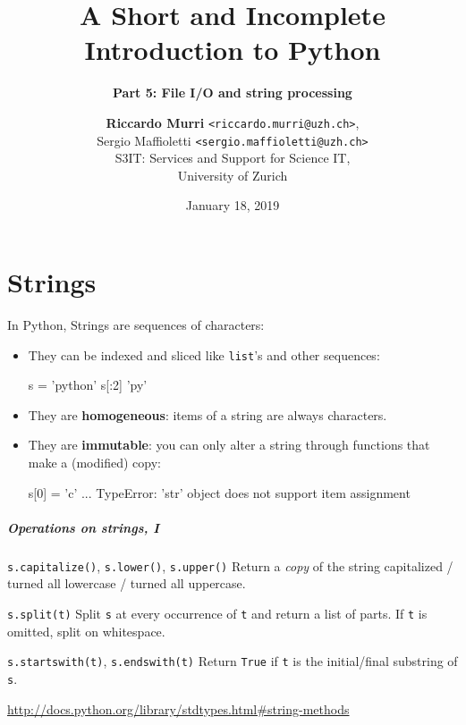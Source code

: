 \documentclass[english,serif,mathserif,xcolor=pdftex,dvipsnames,table]{beamer}
\title[4. Files and strings]{%
  A Short and Incomplete Introduction to Python
}
\subtitle{\bfseries Part 5: File I/O and string processing}
\author[R.~Murri]{%
  \textbf{Riccardo Murri} \texttt{<riccardo.murri@uzh.ch>}, \\
  Sergio Maffioletti \texttt{<sergio.maffioletti@uzh.ch>}
  \\
  S3IT: Services and Support for Science IT,
  \\
  University of Zurich
}
\date{January 18, 2019}
\begin{document}
\maketitle


\part{Strings}


\begin{frame}[fragile]
  In Python, Strings are sequences of characters:
  \begin{itemize}
  \item They can be indexed and sliced like \lstinline|list|'s and other sequences:
\begin{semiverbatim}\small
\In s = 'python'
\In s[:2]
\Out 'py'
\end{semiverbatim}
  \item They are \textbf{homogeneous}: items of a string are always characters.
  \item They are \textbf{immutable}: you can only alter a string through functions that make a (modified) copy:
\begin{semiverbatim}\small
\In s[0] = 'c'
...
TypeError: 'str' object does not support
item assignment
\end{semiverbatim}
  \end{itemize}

\end{frame}


\begin{frame}[fragile]
  \frametitle{Operations on strings, I}
  \begin{describe}{%
      \lstinline|s.capitalize()|,
      \lstinline|s.lower()|,
      \lstinline|s.upper()|}
    Return a \emph{copy} of the string capitalized / turned all lowercase /
    turned all uppercase.
  \end{describe}

  \begin{describe}{\lstinline|s.split(t)|}
    Split \texttt{s} at every occurrence of \texttt{t} and return a list
    of parts.  If \texttt{t} is omitted, split on whitespace.
  \end{describe}

  \begin{describe}{\lstinline|s.startswith(t)|,
      \lstinline|s.endswith(t)|}
    Return \texttt{True} if \texttt{t} is the initial/final substring
    of \texttt{s}.
  \end{describe}

  \begin{references}
    \url{http://docs.python.org/library/stdtypes.html#string-methods}
  \end{references}
\end{frame}
\end{document}
